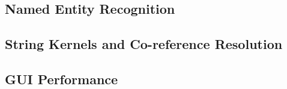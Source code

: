 \subsection{Named Entity Recognition}
\label{sec:eval:named_entity_recognition}


\subsection{String Kernels and Co-reference Resolution}
\label{sec:eval:string_kernels_and_co-reference_resolution}


\subsection{GUI Performance}
\label{sec:eval:gui_performance}
